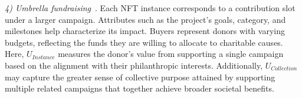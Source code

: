 \documentclass[conference]{IEEEtran}
\theoremstyle{plain}
\begin{document}
{    %
     
    \textit{4) Umbrella fundraising}~\cite{eckel2020independent, li2016social}. Each NFT instance corresponds to a contribution slot under a larger campaign. Attributes such as the project’s goals, category, and milestones help characterize its impact. Buyers represent donors with varying budgets, reflecting the funds they are willing to allocate to charitable causes. 
    Here, $U_{\textit{Instance}}$ measures the donor’s value from supporting a single campaign based on the alignment with their philanthropic interests. Additionally, $U_{\textit{Collection}}$ may capture the greater sense of collective purpose attained by supporting multiple related campaigns that together achieve broader societal benefits.



}
\end{document}
